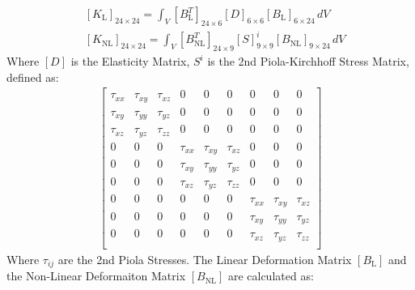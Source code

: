 \documentclass{article}
\begin{document}
\begin{align}
     & {\left[K_{\text{L}}\right]}_{24\times24}
    =\int_{V}{
        {\left[B_\text{L}^T\right]}_{24\times6}
            {\left[D\right]}_{6\times6}
            {\left[B_\text{L}\right]}_{6\times24}
        \,dV}
    \nonumber                                    \\
     & {\left[K_{\text{NL}}\right]}_{24\times24}
    =\int_{V}{
    {\left[B_\text{NL}^T\right]}_{24\times9}
        {\left[S\right]}^i_{9\times9}
    {\left[B_\text{NL}\right]}_{9\times24}
    \,dV}
    \nonumber
\end{align}
Where $\left[D\right]$ is the Elasticity Matrix, $S^i$ is the 2nd Piola-Kirchhoff Stress Matrix, defined as:
\begin{align}
    \left[
        \begin{matrix}
            \tau_{xx} & \tau_{xy} & \tau_{xz} & 0         & 0         & 0         & 0         & 0         & 0         \\
            \tau_{xy} & \tau_{yy} & \tau_{yz} & 0         & 0         & 0         & 0         & 0         & 0         \\
            \tau_{xz} & \tau_{yz} & \tau_{zz} & 0         & 0         & 0         & 0         & 0         & 0         \\
            0         & 0         & 0         & \tau_{xx} & \tau_{xy} & \tau_{xz} & 0         & 0         & 0         \\
            0         & 0         & 0         & \tau_{xy} & \tau_{yy} & \tau_{yz} & 0         & 0         & 0         \\
            0         & 0         & 0         & \tau_{xz} & \tau_{yz} & \tau_{zz} & 0         & 0         & 0         \\
            0         & 0         & 0         & 0         & 0         & 0         & \tau_{xx} & \tau_{xy} & \tau_{xz} \\
            0         & 0         & 0         & 0         & 0         & 0         & \tau_{xy} & \tau_{yy} & \tau_{yz} \\
            0         & 0         & 0         & 0         & 0         & 0         & \tau_{xz} & \tau_{yz} & \tau_{zz} \\
        \end{matrix}
        \right]
    \nonumber
\end{align}
Where $\tau_{ij}$ are the 2nd Piola Stresses.
The Linear Deformation Matrix $\left[B_{\text{L}}\right]$ and the Non-Linear Deformaiton Matrix $\left[B_{\text{NL}}\right]$ are calculated as:
\end{document}
